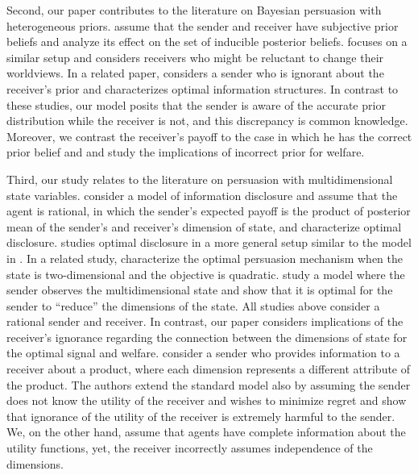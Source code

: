 \documentclass[12pt,english]{article}
\theoremstyle{plain}
\begin{document}
Second, our paper contributes to the literature on Bayesian persuasion with heterogeneous priors.
\cite{alonso2016bayesian} assume that the sender and receiver have subjective prior beliefs and analyze its effect on the set of inducible posterior beliefs. 
\cite{galperti2019persuasion} focuses on a similar setup and considers receivers who might be reluctant to change their worldviews. 
In a related paper, \cite{kosterina2022persuasion} considers a sender who is ignorant about the receiver's prior and characterizes optimal information structures. 
In contrast to these studies, our model posits that the sender is aware of the accurate prior distribution while the receiver is not, and this discrepancy is common knowledge. 
Moreover, we contrast the receiver's payoff to the case in which he has the correct prior belief and and study the implications of incorrect prior for welfare. 

Third, our study relates to the literature on persuasion with multidimensional state variables. 
\cite{rayo2010optimal} consider a model of information disclosure and assume that the agent is rational, in which the sender's expected payoff is the product of posterior mean of the sender's and receiver's dimension of state, and characterize optimal disclosure. 
\cite{tamura2018bayesian} studies optimal disclosure in a more general setup similar to the model in \cite{rayo2010optimal}. 
In a related study, \cite{dworczak2019persuasion} characterize the optimal persuasion mechanism when the state is two-dimensional and the objective is quadratic. 
\cite{malamud2021persuasion} study a model where the sender observes the multidimensional state and show that it is optimal for the sender to ``reduce'' the dimensions of the state.
All studies above consider a rational sender and receiver. 
In contrast, our paper considers implications of the receiver's ignorance regarding the connection between the dimensions of state for the optimal signal and welfare.  
\cite*{babichenko2022regret} consider a sender who provides information to a receiver about a product, where each dimension represents a different attribute of the product. 
The authors extend the standard model also by assuming the sender does not know the utility of the receiver and wishes to minimize regret and show that ignorance of the utility of the receiver is extremely harmful to the sender. 
We, on the other hand, assume that agents have complete information about the utility functions, yet, the receiver  incorrectly assumes independence of the dimensions. 
\end{document}
